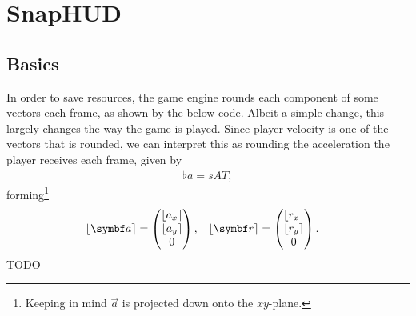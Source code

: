 \section{SnapHUD}
\label{sec:snaphud}

\subsection{Basics}
\label{sec:basics}
In order to save resources, the game engine rounds each component of some vectors each frame, as shown by the below code. Albeit a simple change, this largely changes the way the game is played.
Since player velocity is one of the vectors that is rounded, we can interpret this as rounding the acceleration the player receives each frame, given by
\begin{align*}
\flat{a} = sAT,
\end{align*}
forming\footnote{Keeping in mind $\vec{a}$ is projected down onto the $xy$-plane.}
\begin{align*}
\round{\vec{a}} &=
\begin{pmatrix}
\round{a_x} \\ \round{a_y} \\ 0
\end{pmatrix}, & \round{\vec{r}} &=
\begin{pmatrix}
\round{r_x} \\ \round{r_y} \\ 0
\end{pmatrix}.
\end{align*}
TODO
